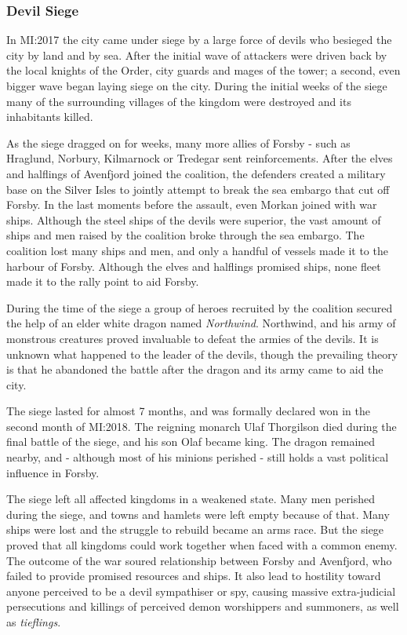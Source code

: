 \subsubsection{Devil Siege}
\label{sec:Devil Siege}


In MI:2017 the city came under siege by a large force of devils who besieged
the city by land and by sea. After the initial wave of attackers were driven
back by the local knights of the Order, city guards and mages of the tower; a
second, even bigger wave began laying siege on the city. During the initial
weeks of the siege many of the surrounding villages of the kingdom were
destroyed and its inhabitants killed.

As the siege dragged on for weeks, many more allies of Forsby - such as
Hraglund, Norbury, Kilmarnock or Tredegar sent reinforcements. After the elves
and halflings of Avenfjord joined the coalition, the defenders created a
military base on the Silver Isles to jointly attempt to break the sea embargo
that cut off Forsby. In the last moments before the assault, even Morkan
joined with war ships. Although the steel ships of the devils were superior,
the vast amount of ships and men raised by the coalition broke through the sea
embargo. The coalition lost many ships and men, and only a handful of vessels
made it to the harbour of Forsby. Although the elves and halflings promised
ships, none fleet made it to the rally point to aid Forsby.

During the time of the siege a group of heroes recruited by the coalition
secured the help of an elder white dragon named \emph{Northwind}. Northwind,
and his army of monstrous creatures proved invaluable to defeat the armies of
the devils. It is unknown what happened to the leader of the devils, though
the prevailing theory is that he abandoned the battle after the dragon and its
army came to aid the city.

The siege lasted for almost 7 months, and was formally declared won in the
second month of MI:2018. The reigning monarch Ulaf Thorgilson died during the
final battle of the siege, and his son Olaf became king. The dragon remained
nearby, and - although most of his minions perished - still holds a vast
political influence in Forsby.

The siege left all affected kingdoms in a weakened state. Many men perished
during the siege, and towns and hamlets were left empty because of that. Many
ships were lost and the struggle to rebuild became an arms race. But the siege
proved that all kingdoms could work together when faced with a common enemy.
The outcome of the war soured relationship between Forsby and Avenfjord, who
failed to provide promised resources and ships. It also lead to hostility
toward anyone perceived to be a devil sympathiser or spy, causing massive
extra-judicial persecutions and killings of perceived demon worshippers and
summoners, as well as \emph{tieflings}.


